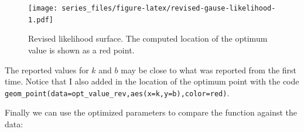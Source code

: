 \documentclass[
]{book}
\newenvironment{Shaded}{\begin{snugshade}}{\end{snugshade}}
\newcommand{\AttributeTok}[1]{\textcolor[rgb]{0.77,0.63,0.00}{#1}}
\newcommand{\CommentTok}[1]{\textcolor[rgb]{0.56,0.35,0.01}{\textit{#1}}}
\newcommand{\FunctionTok}[1]{\textcolor[rgb]{0.00,0.00,0.00}{#1}}
\newcommand{\NormalTok}[1]{#1}
\newcommand{\OtherTok}[1]{\textcolor[rgb]{0.56,0.35,0.01}{#1}}
\newcommand{\SpecialCharTok}[1]{\textcolor[rgb]{0.00,0.00,0.00}{#1}}
\newcommand{\StringTok}[1]{\textcolor[rgb]{0.31,0.60,0.02}{#1}}
\theoremstyle{definition}
\theoremstyle{definition}
\theoremstyle{definition}
\theoremstyle{remark}
\begin{document}
\begin{Shaded}
\end{Shaded}

\begin{figure}
\centering
\texttt{[image: series\_files/figure-latex/revised-gause-likelihood-1.pdf]}
\caption{\label{fig:revised-gause-likelihood}Revised likelihood surface. The computed location of the optimum value is shown as a red point.}
\end{figure}

The reported values for \(k\) and \(b\) may be close to what was reported from the first time. Notice that I also added in the location of the optimum point with the code \texttt{geom\_point(data=opt\_value\_rev,aes(x=k,y=b),color=\textquotesingle{}red\textquotesingle{})}.

Finally we can use the optimized parameters to compare the function against the data:
\end{document}

